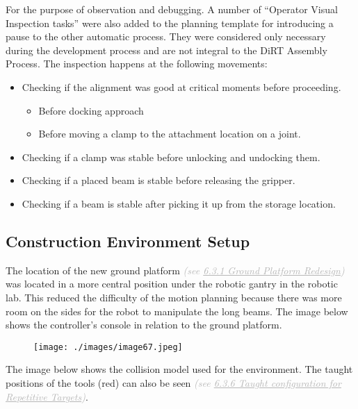 For the purpose of observation and debugging. A number of ``Operator Visual Inspection tasks'' were also added to the planning template for introducing a pause to the other automatic process. They were considered only necessary during the development process and are not integral to the DiRT Assembly Process. The inspection happens at the following movements:

\begin{itemize}
	\item Checking if the alignment was good at critical moments before proceeding.

\begin{itemize}
	\item Before docking approach

	\item Before moving a clamp to the attachment location on a joint.

\end{itemize}
	\item Checking if a clamp was stable before unlocking and undocking them.

	\item Checking if a placed beam is stable before releasing the gripper.

	\item Checking if a beam is stable after picking it up from the storage location.

\end{itemize}
\subsection{Construction Environment Setup}

The location of the new ground platform \textit{\textcolor[HTML]{B7B7B7}{(see \uline{6.3.1 Ground Platform Redesign})}} was located in a more central position under the robotic gantry in the robotic lab. This reduced the difficulty of the motion planning because there was more room on the sides for the robot to manipulate the long beams. The image below shows the controller’s console in relation to the ground platform.

\begin{figure}[H]
\texttt{[image: ./images/image67.jpeg]}
\end{figure}


The image below shows the collision model used for the environment. The taught positions of the tools (red) can also be seen \textit{\textcolor[HTML]{B7B7B7}{(see \uline{6.3.6 Taught configuration for Repetitive Targets})}}.

